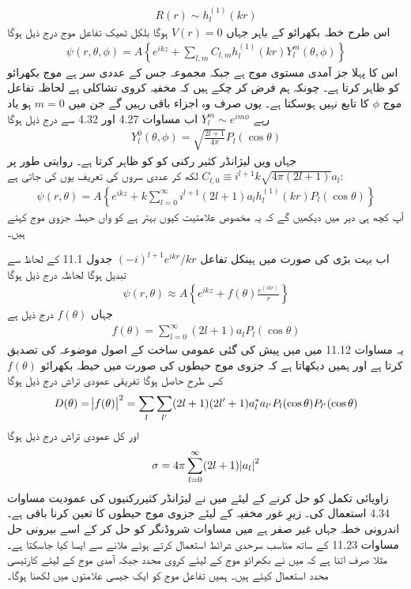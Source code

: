 \begin{align}
	R(r)\sim h^{(1)}_l(kr)
\end{align}
اس طرح خطہ بکھرائو کے باہر جہاں \(V(r) = 0\) ہوگا بلکل ٹھیک تفاعل موج درج ذیل ہوگا
\begin{align}
	\psi(r, \theta, \phi) = A\left\{e^{ikz}+\sum_{l, m}C_{l, m}h^{(1)}_l(kr)Y^m_l(\theta, \phi)\right\}
\end{align}
اس کا پہلا جز آمدی مستوی موج ہے جبکہ مجموعہ جس کے عددی سر  ہے موج بکھرائو کو ظاہر کرتا ہے۔ چونکہ ہم فرض کر چکے ہیں کہ مخفیہ کروی تشاکلی ہے لحاظہ تفاعل موج \(\phi\) کا تابع نہیں ہوسکتا ہے۔ یوں صرف وہ اجزاء باقی رہیں گے جن میں \(m=0\) ہو یاد رہے \(Y_l^m\sim e^{im\phi}\) اب مساوات \num{4.27} اور \num{4.32} سے درج ذیل ہوگا
\begin{align}
	Y^0_l(\theta, \phi) = \sqrt{\frac{2l+1}{4\pi}}P_l(\cos\theta)
\end{align}
جہاں  ویں لیژانڈر کثیر رکنی کو  کو ظاہر کرتا ہے۔ روایتی طور پر \(C_{l, 0}\equiv i^{l+1}k\sqrt{4\pi(2l+1)}a_l\) لکھ کر عددی سروں کی تعریف یوں کی جاتی ہے:
\begin{align}
	\psi(r, \theta) = A\left\{e^{ikz}+k\sum_{l=0}^{\infty}i^{l+1}(2l+1)a_lh_l^{(1)}(kr)P_l(\cos\theta)\right\}
\end{align}
آپ کچھ ہی دیر میں دیکھیں گے کہ یہ مخصوص علامتیت کیوں بہتر ہے  کو  واں حیطہ جزوی موج کہتے ہیں۔

اب بہت بڑی  کی صورت میں ہینکل تفاعل \((-i)^{l+1}e^{ikr}/kr\) جدول \num{11.1} کے لحاظ سے تبدیل ہوگا لحاظہ درج ذیل ہوگا 
\begin{align}
	\psi(r, \theta)\approx A\left\{e^{ikz}+f(\theta)\frac{e^{(ikr)}}{r}\right\}
\end{align}
جہاں \(f(\theta)\) درج ذیل ہے
\begin{align}
	f(\theta) = \sum_{l=0}^{\infty}(2l+1)a_lP_l(\cos\theta)
\end{align}
یہ مساوات \num{11.12} میں میں پیش کی گئی عمومی ساخت کے اصول موضوعہ کی تصدیق کرتا ہے اور ہمیں دیکھاتا ہے کہ جزوی موج حیطوں  کی صورت میں حیطہ بکھرائو \(f(\theta)\) کس طرح حاصل ہوگا تفریقی عمودی تراش درج ذیل ہوگا
\begin{align}
	D(\theta) = \abs{f(\theta)}^2 = \sum_{l}\sum_{l^\prime}(2l+1)(2l^\prime+1)a^*_la_{l^\prime}P_l(\cos\theta)P_{l^\prime}(\cos\theta)
\end{align}
اور کل عمودی تراش درج ذیل ہوگا
\begin{align}
	\sigma=4\pi\sum_{l=0}^{\infty}(2l+1)\abs{a_l}^2
\end{align}
زاویائی تکمل کو حل کرنے کے لیئے میں نے لیژانڈر کثیررکنیوں کی عمودیت مساوات \num{4.34} استعمال کی۔
زیرِ غور مخفیہ کے لیئے جزوی موج حیطوں  کا تعین کرنا باقی ہے۔ اندرونی خطہ جہاں  غیر صفر ہے میں مساوات شروڈنگر کو حل کر کے اسے بیرونی حل مساوات \num{11.23} کے ساتھ مناسب سرحدی شرائط استعمال کرتے ہوئے ملانے سے ایسا کیا جاسکتا ہے۔ مثلا صرف اتنا ہے کہ میں نے بکھرائو موج کے لیئے کروی محدد جبکہ آمدی موج کے لیئے کارتیسی محدد استعمال کیئے ہیں۔ ہمیں تفاعل موج کو ایک جیسی علامتوں میں لکھنا ہوگا۔

